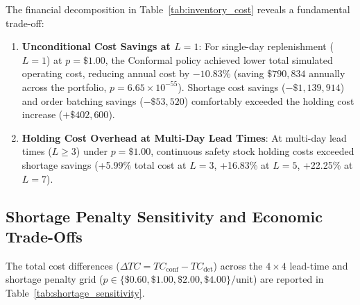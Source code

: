 The financial decomposition in Table~\ref{tab:inventory_cost} reveals a fundamental trade-off:

\begin{enumerate}
    \item \textbf{Unconditional Cost Savings at $L=1$}: For single-day replenishment ($L=1$) at $p=\$1.00$, the Conformal policy achieved lower total simulated operating cost, reducing annual cost by $-10.83\%$ (saving $\$790,834$ annually across the portfolio, $p = 6.65 \times 10^{-55}$). Shortage cost savings ($-\$1,139,914$) and order batching savings ($-\$53,520$) comfortably exceeded the holding cost increase ($+\$402,600$).
    \item \textbf{Holding Cost Overhead at Multi-Day Lead Times}: At multi-day lead times ($L \ge 3$) under $p=\$1.00$, continuous safety stock holding costs exceeded shortage savings (+5.99\% total cost at $L=3$, +16.83\% at $L=5$, +22.25\% at $L=7$).
\end{enumerate}

\subsection{Shortage Penalty Sensitivity and Economic Trade-Offs}
The total cost differences ($\Delta TC = TC_{\text{conf}} - TC_{\text{det}}$) across the $4 \times 4$ lead-time and shortage penalty grid ($p \in \{\$0.60, \$1.00, \$2.00, \$4.00\}/\text{unit}$) are reported in Table~\ref{tab:shortage_sensitivity}.

\begin{table}[htbp]
\centering
\caption{Shortage Penalty Sensitivity Analysis: Net Annual Operating Cost Delta ($\Delta TC = TC_{\text{conf}} - TC_{\text{det}}$)}
\label{tab:shortage_sensitivity}
\small
{}
\end{table}

